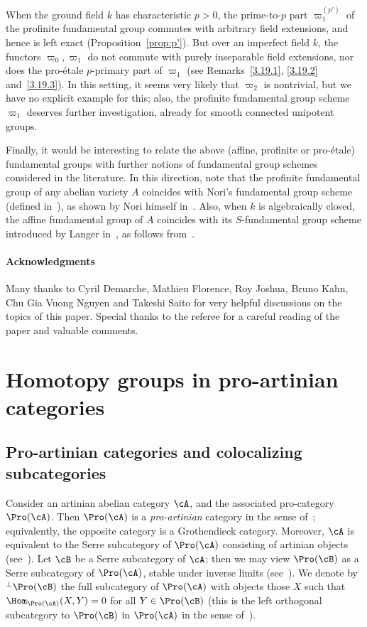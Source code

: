 When the ground field $k$ has characteristic $p > 0$, the prime-to-$p$ part $\varpi_1^{(p')}$ of the profinite fundamental group commutes with arbitrary field extensions, and hence is left exact (Proposition~\ref{prop:p'}). But over an imperfect field $k$, the functors $\varpi_0,\varpi_1$ do not commute with purely inseparable field extensions, nor does the pro-\'etale $p$-primary part of $\varpi_1$ (see Remarks~\ref{3.19.1}, \ref{3.19.2} and~\ref{3.19.3}). In this setting, it seems very likely that $\varpi_2$ is nontrivial, but we have no explicit example for this; also, the profinite fundamental group scheme $\varpi_1$ deserves further investigation, already for smooth connected unipotent groups.

Finally, it would be interesting to relate the above (affine, profinite or pro-\'etale) fundamental groups with further notions of fundamental group schemes considered in the literature. In this direction, note that the profinite fundamental group of any abelian variety $A$ coincides with Nori's fundamental group scheme (defined in~\cite{No76, No82}), as shown by Nori himself in~\cite{No83}. Also, when $k$ is algebraically closed, the affine fundamental group of $A$ coincides with its $S$-fundamental group scheme introduced by Langer in~\cite{La11}, as follows from~\cite[Thm.~6.1]{La12}.

\paragraph{Acknowledgments}
Many thanks to Cyril Demarche, Mathieu Florence, Roy Joshua, Bruno Kahn, Chu Gia Vuong Nguyen and Takeshi Saito for very helpful discussions on the topics of this paper. Special thanks to the referee for a careful reading of the paper and valuable comments.


\section{Homotopy groups in pro-artinian categories}\label{sec:homotopy}

\subsection{Pro-artinian categories and colocalizing subcategories}\label{subsec:pro-artinian}

Consider an artinian abelian category $\cA$, and the associated pro-category $\Pro(\cA)$. Then $\Pro(\cA)$ is a \emph{pro-artinian} category in the sense of~\cite[V.2.2]{DG}; equivalently, the opposite category is a Grothendieck category. Moreover, $\cA$ is equivalent to the Serre subcategory of $\Pro(\cA)$ consisting of artinian objects (see~\cite[V.2.3.1]{DG}). Let $\cB$ be a Serre subcategory of $\cA$; then we may view $\Pro(\cB)$ as a Serre subcategory of $\Pro(\cA)$, stable under inverse limits (see~\cite[Lem.~2.11]{Br17b}). We denote by ${^{\perp}\Pro(\cB)}$ the full subcategory of $\Pro(\cA)$ with objects those $X$ such that $\Hom_{\Pro(\cA)}(X,Y) = 0$ for all $Y \in \Pro(\cB)$ (this is the left orthogonal subcategory to $\Pro(\cB)$ in $\Pro(\cA)$ in the sense of~\cite[II.1]{BR}).

